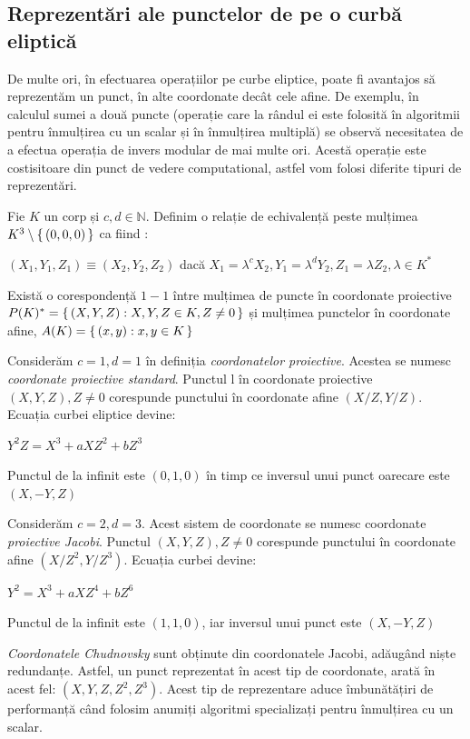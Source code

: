 \subsection{Reprezentări ale punctelor de pe o curbă eliptică}
\label{subsec:subsec03}
De multe ori, în efectuarea operațiilor pe curbe eliptice, poate fi avantajos să reprezentăm un punct, în alte coordonate decât cele afine. De exemplu, în calculul sumei a două puncte (operație care la rândul ei este folosită în algoritmii pentru înmulțirea cu un scalar și în înmulțirea multiplă) se observă necesitatea de a efectua operația de invers modular de mai multe ori. Acestă operație este costisitoare din punct de vedere computational, astfel vom folosi diferite tipuri de reprezentări.
\begin{dfn}
Fie $K$ un corp și $c, d\in \mathbb{N}$. Definim o relație de echivalență peste mulțimea $K^3\setminus \set {(0, 0, 0)}$ ca fiind :
\begin{center} $(X_1, Y_1, Z_1) \equiv (X_2, Y_2, Z_2)$ dacă $X_1 = \lambda ^cX_2, Y_1 = \lambda ^d Y_2, Z_1 = \lambda Z_2, \lambda\in K^{*}$\end{center}
Există o corespondență $1-1$ între mulțimea de puncte în coordonate proiective $P(K)^{*} = \set {(X, Y, Z): X, Y, Z\in K, Z\neq 0}$ și mulțimea punctelor în coordonate afine, $A(K) = \set {(x, y): x, y\in K}$
\end{dfn}
\begin{dfn}
Considerăm $c=1, d=1$ în definiția \textit{coordonatelor proiective}. Acestea se numesc \textit{coordonate proiective standard}. Punctul l în coordonate proiective $(X, Y, Z), Z\neq 0$ corespunde punctului în coordonate afine $(X/Z, Y/Z)$. Ecuația curbei eliptice devine:
\begin{center}  $Y^2Z = X^3 + aXZ^2 + bZ^3$ \end{center}
Punctul de la infinit este $(0, 1, 0)$ în timp ce inversul unui punct oarecare este $(X, -Y, Z)$
\end{dfn}
\begin{dfn}
Considerăm $c=2, d=3$. Acest sistem de coordonate se numesc coordonate \textit{proiective Jacobi}. Punctul $(X, Y, Z), Z\neq 0$ corespunde punctului 
în coordonate afine $(X/Z^2, Y/Z^3)$. Ecuația curbei devine:
\begin{center} $Y^2 = X^3 + aXZ^4 + bZ^6$ \end{center}
Punctul de la infinit este $(1, 1, 0)$, iar inversul unui punct este $(X, -Y, Z)$
\end{dfn}
\begin{dfn}
\textit{Coordonatele Chudnovsky} sunt obținute din coordonatele Jacobi, adăugând niște redundanțe. Astfel, un punct reprezentat în acest tip de coordonate, arată în acest fel: $(X, Y, Z, Z^2, Z^3)$. Acest tip de reprezentare aduce îmbunătățiri de performanță când folosim anumiți algoritmi specializați pentru înmulțirea cu un scalar.
\end{dfn}

